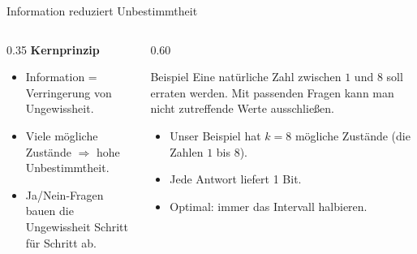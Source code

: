 \begin{frame}{Information reduziert Unbestimmtheit}

\begin{columns}

\begin{column}{0.35\textwidth}
\textbf{Kernprinzip}
\begin{itemize}
  \item Information = Verringerung von Ungewissheit.
  \item Viele mögliche Zustände $\Rightarrow$ hohe Unbestimmtheit.
  \item Ja/Nein-Fragen bauen die Ungewissheit Schritt für Schritt ab.
\end{itemize}
\end{column}

\begin{column}{0.60\textwidth}
\begin{exampleblock}{Beispiel}
Eine natürliche Zahl zwischen $1$ und $8$ soll erraten werden.  
Mit passenden Fragen kann man nicht zutreffende Werte ausschließen.
\end{exampleblock}
\medskip
\begin{itemize}
  \item Unser Beispiel hat $k=8$ mögliche Zustände (die Zahlen $1$ bis $8$).
  \item Jede Antwort liefert 1 Bit.
  \item Optimal: immer das Intervall halbieren.
\end{itemize}

\end{column}

\end{columns}

\end{frame}

